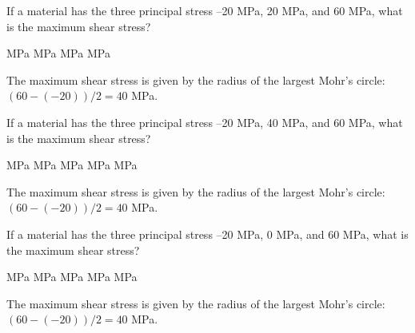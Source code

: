\variant
If a material has the three principal stress --20 MPa, 20 MPa, and 60 MPa, what is the maximum shear stress?
\begin{answers}
 MPa
 MPa
 MPa
 MPa
\end{answers}
\begin{solution}
The maximum shear stress is given by the radius of the largest Mohr's circle: $(60-(-20))/2=40$ MPa.
\end{solution}

\variant
If a material has the three principal stress --20 MPa, 40 MPa, and 60 MPa, what is the maximum shear stress?
\begin{answers}
 MPa
 MPa
 MPa
 MPa
 MPa
\end{answers}
\begin{solution}
The maximum shear stress is given by the radius of the largest Mohr's circle: $(60-(-20))/2=40$ MPa.
\end{solution}

\variant
If a material has the three principal stress --20 MPa, 0 MPa, and 60 MPa, what is the maximum shear stress?
\begin{answers}
 MPa
 MPa
 MPa
 MPa
 MPa
\end{answers}
\begin{solution}
The maximum shear stress is given by the radius of the largest Mohr's circle: $(60-(-20))/2=40$ MPa.
\end{solution}

